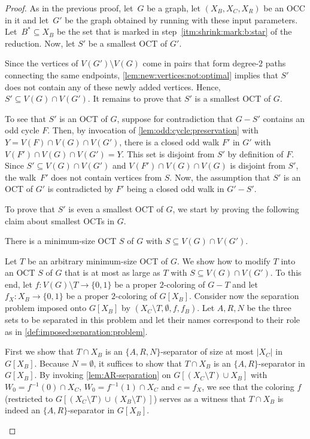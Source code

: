 \lemBackwardSafety*
\begin{proof}
	As in the previous proof, let~$G$ be a graph, let $(X_B, X_C, X_R)$ be an OCC in it and let~$G'$ be the graph obtained by running  with these input parameters. Let~$B^\ast \subseteq X_B$ be the set that is marked in step~\ref{itm:shrink:mark:b:star} of the reduction. Now, let $S'$ be a smallest OCT of $G'$. 
	
	Since the vertices of $V(G') \setminus V(G)$ come in pairs that form degree-$2$ paths connecting the same endpoints, \cref{lem:new:vertices:not:optimal} implies that $S'$ does not contain any of these newly added vertices. Hence, $S' \subseteq V(G) \cap V(G')$. It remains to prove that $S'$ is a smallest OCT of $G$.
	
	To see that $S'$ is an OCT of $G$, suppose for contradiction that $G - S'$ contains an odd cycle $F$. Then, by invocation of  \cref{lem:odd:cycle:preservation} with $Y = V(F) \cap V(G) \cap V(G')$, there is a closed odd walk $F'$ in $G'$ with $V(F') \cap V(G) \cap V(G') = Y$. This set is disjoint from $S'$ by definition of $F$. Since $S' \subseteq V(G) \cap V(G')$ and $V(F') \cap V(G) \cap V(G)$ is disjoint from $S'$, the walk~$F'$ does not contain vertices from $S$. Now, the assumption that $S'$ is an OCT of $G'$ is contradicted by $F'$ being a closed odd walk in $G' - S'$.
	
	To prove that $S'$ is even a smallest OCT of $G$, we start by proving the following claim about smallest OCTs in $G$.
	
	\begin{claim} \label{clm:optimal:oct:exists:with:untouched:vertices}
		There is a minimum-size OCT $S$ of $G$ with $S \subseteq V(G) \cap V(G')$. 
	\end{claim}
	\begin{claimproof}
		Let $T$ be an arbitrary minimum-size OCT of $G$. We show how to modify $T$ into an OCT $S$ of $G$ that is at most as large as $T$ with $S \subseteq V(G) \cap V(G')$. To this end, let $f \colon V(G) \setminus T \rightarrow \{0,1\}$ be a proper $2$-coloring of $G - T$ and let $f_X \colon X_B \rightarrow \{0,1\}$ be a proper $2$-coloring of $G[X_B]$. Consider now the separation problem imposed onto $G[X_B]$ by $(X_C \setminus T, \emptyset, f, f_B)$. Let $A, R, N$ be the three sets to be separated in this problem and let their names correspond to their role as in \cref{def:imposed:separation:problem}. 
		
		First we show that $T \cap X_B$ is an $\{A, R, N\}$-separator of size at most $|X_C|$ in $G[X_B]$. Because $N = \emptyset$, it suffices to show that $T \cap X_B$ is an $\{A, R\}$-separator in $G[X_B]$. By invoking \cref{lem:AR-separation} on $G[(X_C \setminus T) \cup X_B]$ with $W_0 = f^{-1}(0) \cap X_C$, $W_0 = f^{-1}(1) \cap X_C$ and $c = f_X$, we see that the coloring $f$ (restricted to $G[(X_C \setminus T) \cup (X_B \setminus T)]$) serves as a witness that $T \cap X_B$ is indeed an $\{A, R\}$-separator in $G[X_B]$.
		

\end{claimproof}
\end{proof}
